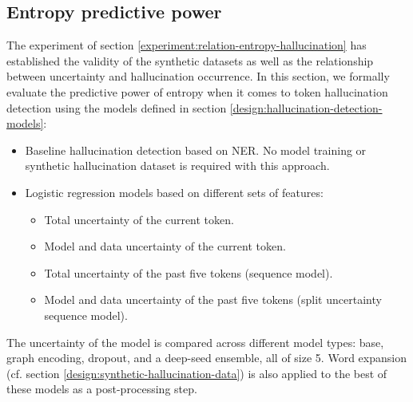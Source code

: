 \begin{table}[!ht]
{\begin{tabular}{clccccccccc}


\bottomrule
\end{tabular}
}
\end{table}


\subsection{Entropy predictive power} \label{experiment:entropy-predictive-power}

The experiment of section \ref{experiment:relation-entropy-hallucination} has established the validity of the synthetic datasets as well as the relationship between uncertainty and hallucination occurrence. In this section, we formally evaluate the predictive power of entropy when it comes to token hallucination detection using the models defined in section \ref{design:hallucination-detection-models}:
\begin{itemize}
    \item Baseline hallucination detection based on NER. No model training or synthetic hallucination dataset is required with this approach.
    \item Logistic regression models based on different sets of features:
    \begin{itemize}
        \item Total uncertainty of the current token.
        \item Model and data uncertainty of the current token.
        \item Total uncertainty of the past five tokens (sequence model).
        \item Model and data uncertainty of the past five tokens (split uncertainty sequence model).
    \end{itemize}
\end{itemize}
The uncertainty of the model is compared across different model types: base, graph encoding, dropout, and a deep-seed ensemble, all of size 5. Word expansion (cf. section \ref{design:synthetic-hallucination-data}) is also applied to the best of these models as a post-processing step.

